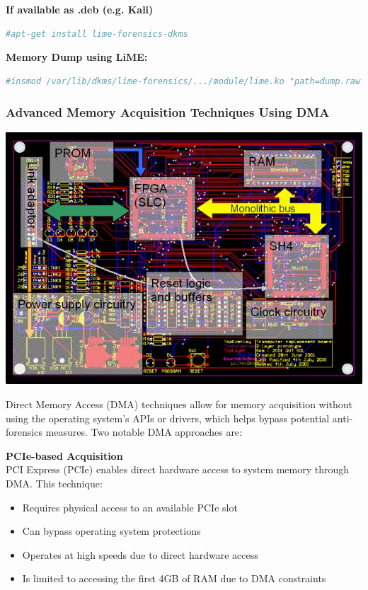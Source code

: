 \textbf{If available as .deb (e.g. Kali)}
\begin{lstlisting}[language=sh]
#apt-get install lime-forensics-dkms
\end{lstlisting}

\textbf{Memory Dump using LiME:}
\begin{lstlisting}[language=sh]
#insmod /var/lib/dkms/lime-forensics/.../module/lime.ko "path=dump.raw format=raw"
\end{lstlisting}



\subsubsection*{Advanced Memory Acquisition Techniques Using DMA}
\begin{center}
  \includegraphics[width=\textwidth]{resources/13-volatility-mainboard.png}
\end{center}

Direct Memory Access (DMA) techniques allow for memory acquisition without using the operating system's APIs or drivers, which helps bypass potential anti-forensics measures. Two notable DMA approaches are:

\textbf{PCIe-based Acquisition}\\
PCI Express (PCIe) enables direct hardware access to system memory through DMA. This technique:
\begin{itemize}
    \item Requires physical access to an available PCIe slot
    \item Can bypass operating system protections
    \item Operates at high speeds due to direct hardware access
    \item Is limited to accessing the first 4GB of RAM due to DMA constraints
\end{itemize}


